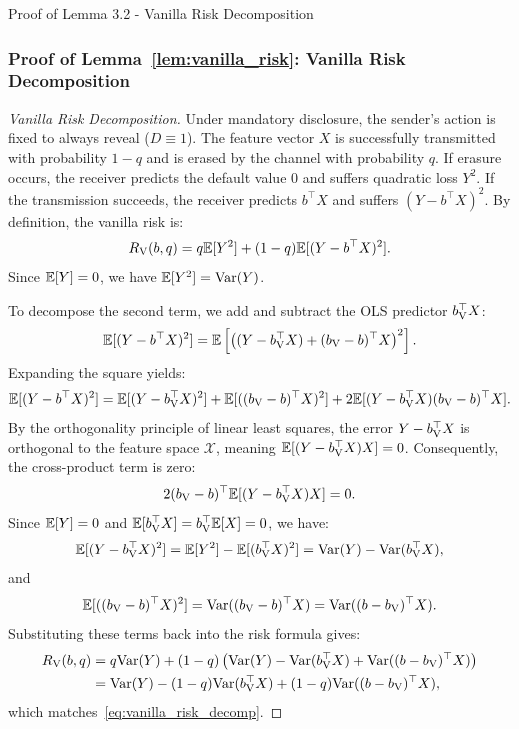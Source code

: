 \begin{sourceblock}{Proof of Lemma 3.2 - Vanilla Risk Decomposition}
\subsubsection*{Proof of Lemma~\ref{lem:vanilla_risk}: Vanilla Risk Decomposition}
\label{app:proof_vanilla_risk}
\begin{proof}[Vanilla Risk Decomposition]
Under mandatory disclosure, the sender's action is fixed to always reveal ($D \equiv 1$). The feature vector $X$ is successfully transmitted with probability $1 - q$ and is erased by the channel with probability $q$. If erasure occurs, the receiver predicts the default value $0$ and suffers quadratic loss $Y^2$. If the transmission succeeds, the receiver predicts $b^\top X$ and suffers $(Y - b^\top X)^2$. By definition, the vanilla risk is:
\begin{equation}
    R_{\mathrm{V}}(b, q) = q\mathbb{E}[Y^2] + (1 - q)\mathbb{E}[(Y - b^\top X)^2].
\end{equation}
Since $\mathbb{E}[Y] = 0$, we have $\mathbb{E}[Y^2] = \mathrm{Var}(Y)$. 

To decompose the second term, we add and subtract the OLS predictor $b_{\mathrm{V}}^\top X$:
\begin{equation}
    \mathbb{E}[(Y - b^\top X)^2] = \mathbb{E}\left[ \left( (Y - b_{\mathrm{V}}^\top X) + (b_{\mathrm{V}} - b)^\top X \right)^2 \right].
\end{equation}
Expanding the square yields:
\begin{equation}
    \mathbb{E}[(Y - b^\top X)^2] = \mathbb{E}[(Y - b_{\mathrm{V}}^\top X)^2] + \mathbb{E}[((b_{\mathrm{V}} - b)^\top X)^2] + 2\mathbb{E}[(Y - b_{\mathrm{V}}^\top X)(b_{\mathrm{V}} - b)^\top X].
\end{equation}
By the orthogonality principle of linear least squares, the error $Y - b_{\mathrm{V}}^\top X$ is orthogonal to the feature space $\mathcal{X}$, meaning $\mathbb{E}[(Y - b_{\mathrm{V}}^\top X)X] = 0$. Consequently, the cross-product term is zero:
\begin{equation}
    2(b_{\mathrm{V}} - b)^\top \mathbb{E}[(Y - b_{\mathrm{V}}^\top X)X] = 0.
\end{equation}
Since $\mathbb{E}[Y] = 0$ and $\mathbb{E}[b_{\mathrm{V}}^\top X] = b_{\mathrm{V}}^\top \mathbb{E}[X] = 0$, we have:
\begin{equation}
    \mathbb{E}[(Y - b_{\mathrm{V}}^\top X)^2] = \mathbb{E}[Y^2] - \mathbb{E}[(b_{\mathrm{V}}^\top X)^2] = \mathrm{Var}(Y) - \mathrm{Var}(b_{\mathrm{V}}^\top X),
\end{equation}
and
\begin{equation}
    \mathbb{E}[((b_{\mathrm{V}} - b)^\top X)^2] = \mathrm{Var}((b_{\mathrm{V}} - b)^\top X) = \mathrm{Var}((b - b_{\mathrm{V}})^\top X).
\end{equation}
Substituting these terms back into the risk formula gives:
\begin{align}
    R_{\mathrm{V}}(b, q) &= q\mathrm{Var}(Y) + (1 - q)\left( \mathrm{Var}(Y) - \mathrm{Var}(b_{\mathrm{V}}^\top X) + \mathrm{Var}((b - b_{\mathrm{V}})^\top X) \right) \nonumber \\
    &= \mathrm{Var}(Y) - (1 - q)\mathrm{Var}(b_{\mathrm{V}}^\top X) + (1 - q)\mathrm{Var}((b - b_{\mathrm{V}})^\top X),
\end{align}
which matches~\eqref{eq:vanilla_risk_decomp}. 


\end{proof}
\end{sourceblock}
